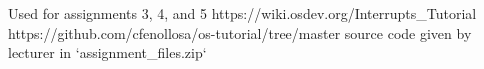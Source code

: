 Used for assignments 3, 4, and 5
https://wiki.osdev.org/Interrupts_Tutorial
https://github.com/cfenollosa/os-tutorial/tree/master
source code given by lecturer in `assignment_files.zip`